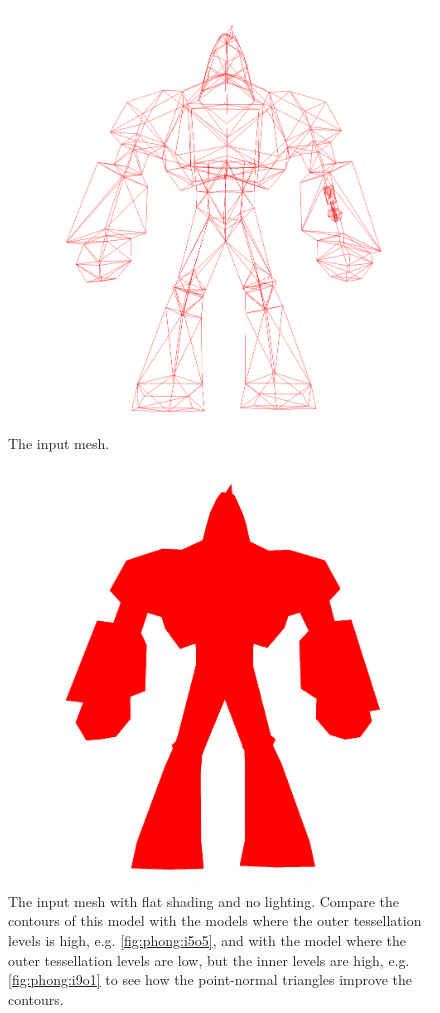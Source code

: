 \documentclass[a4paper,10pt]{article}
\begin{document}
\begin{figure}
	\includegraphics[width=\textwidth]{enforcer_wireframe.png}
	\caption{The input mesh.}		
	\label{fig:enforcerWireframe}	
\end{figure}


\begin{figure}
	\includegraphics[width=\textwidth]{enforcer_flat.png}
	\caption{The input mesh with flat shading and no lighting. Compare the contours of this model with the models where the outer tessellation levels is high, e.g. \cref{fig:phong:i5o5}, and with the model where the outer tessellation levels are low, but the inner levels are high, e.g. \cref{fig:phong:i9o1} to see how the point-normal triangles improve the contours.}
	\label{fig:enforcerFlat}	
\end{figure}
\end{document}
